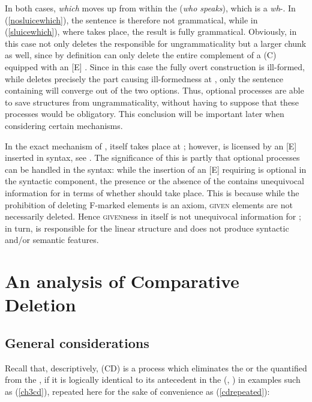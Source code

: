 In both cases, \textit{which} moves up from within the    (\textit{who speaks}), which is a \textit{wh}-. In (\ref{nosluicewhich}), the sentence is therefore not grammatical, while in (\ref{sluicewhich}), where  takes place, the result is fully grammatical. Obviously,  in this case not only deletes the  responsible for ungrammaticality but a larger chunk as well, since  by definition can only delete the entire complement of a  (C) equipped with an [E] . Since in this case the fully overt construction is ill-formed, while  deletes precisely the part causing ill-formedness at , only the sentence containing  will converge out of the two options. Thus, optional  processes are able to save structures from ungrammaticality, without having to suppose that these processes would be obligatory. This conclusion will be important later when considering certain  mechanisms.

In the exact mechanism of ,  itself takes place at ; however,  is licensed by an [E]  inserted in syntax, see \citet{merchant2001}. The significance of this is partly that optional  processes can be handled in the syntax: while the insertion of an [E]  requiring  is optional in the syntactic component, the presence or the absence of the  contains unequivocal information for  in terms of whether  should take place. This is because while the prohibition of deleting F-marked elements is an axiom, \textsc{given} elements are not necessarily deleted. Hence \textsc{given}ness in itself is not unequivocal information for ; in turn,  is responsible for the linear structure and does not produce syntactic and/or semantic features.

\section{An analysis of Comparative Deletion} \label{sec:3analysis}
\subsection{General considerations} \label{sec:3general}
Recall that, descriptively,  (CD) is a process which eliminates the  or the quantified  from the , if it is logically identical to its antecedent in the  (\citealt{bacskaiatkari2010even}, \citealt{bacskaiatkari2012elte}) in examples such as (\ref{ch3cd}), repeated here for the sake of convenience as (\ref{cdrepeated}):

